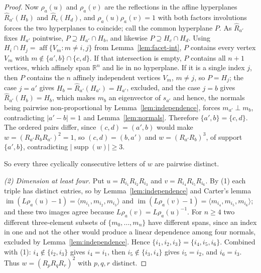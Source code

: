 \documentclass[11pt,a4paper]{article}
\newcommand{\R}{\mathbb{R}}
\theoremstyle{definition}
\theoremstyle{remark}
\theoremstyle{plain}
\begin{document}
\begin{proof}
Now $\rho_a(u)$ and $\rho_a(v)$ are the reflections in the affine hyperplanes
$\widehat R_{a'}(H_b)$ and $\widehat R_c(H_d)$, and $\rho_a(u)\rho_a(v)=1$ with both factors
involutions forces the two hyperplanes to coincide; call the common hyperplane $P$. As
$\widehat R_{a'}$ fixes $H_{a'}$ pointwise, $P\supseteq H_{a'}\cap H_b$, and likewise
$P\supseteq H_c\cap H_d$. Using $H_i\cap H_j=\operatorname{aff}\{V_m:m\ne i,j\}$ from
Lemma~\ref{lem:facet-int}, $P$ contains every vertex $V_m$ with
$m\notin\{a',b\}\cap\{c,d\}$. If that intersection is empty, $P$ contains all $n+1$ vertices,
which affinely span $\R^n$ and lie in no hyperplane. If it is a single index $j$, then $P$
contains the $n$ affinely independent vertices $V_m$, $m\ne j$, so $P=H_j$; the case $j=a'$
gives $H_b=\widehat R_{a'}(H_{a'})=H_{a'}$, excluded, and the case $j=b$ gives
$\widehat R_{a'}(H_b)=H_b$, which makes $m_b$ an eigenvector of $s_{a'}$ and hence, the normals
being pairwise non-proportional by Lemma~\ref{lem:independence}, forces $m_{a'}\perp m_b$,
contradicting $|a'-b|=1$ and Lemma~\ref{lem:normals}. Therefore $\{a',b\}=\{c,d\}$. The ordered
pairs differ, since $(c,d)=(a',b)$ would make $w=(R_{a'}R_bR_{a'})^2=1$, so $(c,d)=(b,a')$ and
$w=(R_{a'}R_b)^3$, of support $\{a',b\}$, contradicting $|\operatorname{supp}(w)|\ge3$.

So every three cyclically consecutive letters of $w$ are pairwise distinct.

\emph{(2) Dimension at least four.} Put $u=R_{i_1}R_{i_2}R_{i_3}$ and $v=R_{i_4}R_{i_5}R_{i_6}$.
By (1) each triple has distinct entries, so by Lemma~\ref{lem:independence} and Carter's lemma
$\operatorname{im}(L\rho_a(u)-1)=\langle m_{i_1},m_{i_2},m_{i_3}\rangle$ and
$\operatorname{im}(L\rho_a(v)-1)=\langle m_{i_4},m_{i_5},m_{i_6}\rangle$; and these two images
agree because $L\rho_a(v)=L\rho_a(u)^{-1}$. For $n\ge4$ two different three-element subsets of
$\{m_0,\dots,m_n\}$ have different spans, since an index in one and not the other would produce
a linear dependence among four normals, excluded by Lemma~\ref{lem:independence}. Hence
$\{i_1,i_2,i_3\}=\{i_4,i_5,i_6\}$. Combined with (1): $i_4\notin\{i_2,i_3\}$ gives $i_4=i_1$,
then $i_5\notin\{i_3,i_4\}$ gives $i_5=i_2$, and $i_6=i_3$. Thus $w=(R_pR_qR_r)^2$ with
$p,q,r$ distinct.


\end{proof}
\end{document}
